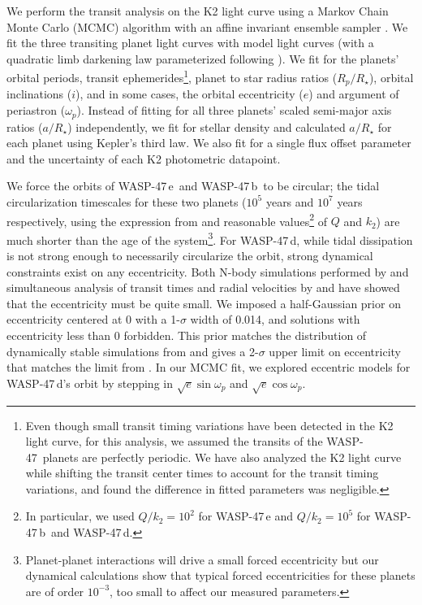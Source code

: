 \documentclass{emulateapj}
\newcommand{\ron}{\color{black}}
\newcommand{\thisstar}{WASP-47}
\newcommand{\thisfirstplanet}{WASP-47\,b}
\newcommand{\thissecondplanet}{WASP-47\,e}
\newcommand{\thisthirdplanet}{WASP-47\,d}
\begin{document}
We perform the transit analysis on the K2 light curve using a Markov Chain Monte Carlo (MCMC) algorithm with an affine invariant ensemble sampler \citep{goodman}. We fit the three transiting planet light curves with \citet{mandelagol} model light curves (with a quadratic limb darkening law parameterized following \citealt{kippingld}).  We fit for the planets' orbital periods, transit ephemerides\footnote{Even though small transit timing variations have been detected in the K2 light curve, for this analysis, we assumed the transits of the \thisstar\ planets are perfectly periodic. We have also analyzed the K2 light curve while shifting the transit center times to account for the transit timing variations, and found the difference in fitted parameters was negligible.}, planet to star {\ron radius} ratios ($R_p/R_\star$), orbital inclinations ($i$), and in some cases, the orbital eccentricity ($e$) and argument of periastron ($\omega_p$). Instead of fitting for all three planets' scaled semi-major axis ratios ($a/R_\star$) independently, we fit for stellar density and calculated $a/R_\star$ for each planet using Kepler's third law. We also fit for a single flux offset parameter and the uncertainty of each K2 photometric datapoint. 

We force the orbits of \thissecondplanet\ and \thisfirstplanet\ to be circular; the tidal circularization timescales for these two planets ($10^5 $ years and $10^7$ years respectively, using the expression from \citealt{goldreich} and reasonable values\footnote{In particular, we used $Q/k_2 = 10^2$ for {\ron \thissecondplanet} and $Q/k_2 = 10^5$ for \thisfirstplanet\ and \thisthirdplanet.} of $Q$ and $k_2$) are much shorter than the age of the system{\ron\footnote{\ron Planet-planet interactions will drive a small forced eccentricity but our dynamical calculations show that typical forced eccentricities for these planets are of order $10^{-3}$, too small to affect our measured parameters.}}. For \thisthirdplanet, while tidal dissipation is not strong enough to necessarily circularize the orbit, strong dynamical constraints exist on any eccentricity. Both N-body simulations performed by \citet{becker} and simultaneous analysis of transit times and radial velocities by \citet{almenara} and \citet{weissw47} have showed that the eccentricity must be quite small. We imposed a half-Gaussian prior on eccentricity centered at 0 with a 1-$\sigma$ width of 0.014, and solutions with eccentricity less than 0 forbidden. This prior matches the distribution of dynamically stable simulations from \citet{becker} and gives a 2-$\sigma$ upper limit on eccentricity that matches the limit from \citet{weissw47}. In our MCMC fit, we explored eccentric models for \thisthirdplanet's orbit by stepping in $\sqrt{e}\sin{\omega_p}$ and $\sqrt{e}\cos{\omega_p}$. 
\end{document}
